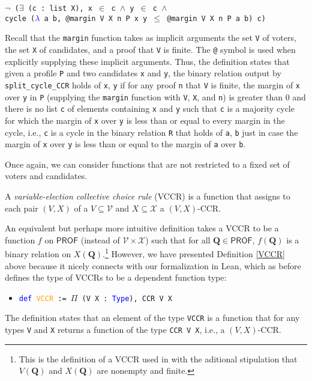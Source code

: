 \documentclass[runningheads]{llncs}
\begin{document}
\begin{example}
\begin{itemize}
    \texttt{$\neg$ ($\exists$ (c : list X), x $\in$ c $\wedge$ y $\in$ c $\wedge$}\\
    \texttt{cycle (\textcolor{blue}{$\lambda$} a b, @margin V X n P x y $\leq$ @margin V X n P a b) c)}
\end{itemize}
Recall that the \texttt{margin} function takes as implicit arguments the set \texttt{V} of voters, the set \texttt{X} of candidates, and a proof that \texttt{V} is finite. The \texttt{@} symbol is used when explicitly supplying these implicit arguments. Thus, the definition states that given a profile \texttt{P} and two candidates \texttt{x} and \texttt{y}, the binary relation output by \texttt{split\_cycle\_CCR} holds of \texttt{x}, \texttt{y} if for any proof \texttt{n} that \texttt{V} is finite, the margin of \texttt{x} over \texttt{y} in \texttt{P} (supplying the \texttt{margin} function with \texttt{V}, \texttt{X}, and \texttt{n}) is greater than 0 and there is no list \texttt{c} of elements containing \texttt{x} and \texttt{y} such that \texttt{c} is a majority cycle for which the margin of \texttt{x} over \texttt{y} is less than or equal to every margin in the cycle, i.e., \texttt{c} is a cycle in the binary relation \texttt{R} that holds of \texttt{a}, \texttt{b} just in case the margin of \texttt{x} over \texttt{y} is less than or equal to the margin of \texttt{a} over \texttt{b}.

\end{example}

Once again, we can consider functions that are not restricted to a fixed set of voters and candidates.

\begin{definition}\label{VCCR} \textnormal{A \emph{variable-election collective choice rule} (VCCR) is a function that assigns to each pair $(V,X)$ of a $V\subseteq\mathcal{V}$ and $X\subseteq\mathcal{X}$ a $(V,X)$-CCR.}%
\end{definition}

\noindent An equivalent but perhaps more intuitive definition takes a VCCR to be a function $f$ on $\mathsf{PROF}$ (instead of $\mathcal{V}\times\mathcal{X}$) such that for all $\mathbf{Q}\in\mathsf{PROF}$, $f(\mathbf{Q})$ is a binary relation on $X(\mathbf{Q})$.\footnote{This is the definition of a VCCR used in \cite{HP2020} with the aditional stipulation that $V(\mathbf{Q})$ and $X(\mathbf{Q})$ are nonempty and finite.} However, we have presented Definition \ref{VCCR} above because it nicely connects with our formalization in Lean, which as before defines the type of VCCRs to be a dependent function type:
\begin{itemize}
\item[] \texttt{\textcolor{blue}{def} \textcolor{orange}{VCCR} := $\Pi$ (V X : \textcolor{blue}{Type}), CCR V X}
\end{itemize}
The definition states that an element of the type \texttt{VCCR} is a function that for any types \texttt{V} and \texttt{X} returns a function of the type \texttt{CCR V X}, i.e., a $(V,X)$-CCR.
\end{document}
